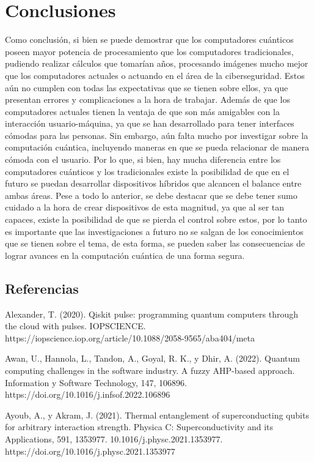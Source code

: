 \documentclass[twoside]{article}
\begin{document}
\section{Conclusiones}
Como conclusión, si bien se puede demostrar que los computadores cuánticos poseen mayor potencia de procesamiento que los computadores tradicionales, pudiendo realizar cálculos que tomarían años, procesando imágenes mucho mejor que los computadores actuales o actuando en el área de la ciberseguridad. Estos aún no cumplen con todas las expectativas que se tienen sobre ellos, ya que presentan errores y complicaciones a la hora de trabajar. Además de que los computadores actuales tienen la ventaja de que son más amigables con la interacción usuario-máquina, ya que se han desarrollado para tener interfaces cómodas para las personas. Sin embargo, aún falta mucho por investigar sobre la computación cuántica, incluyendo maneras en que se pueda relacionar de manera cómoda con el usuario. Por lo que, si bien, hay mucha diferencia entre los computadores cuánticos y los tradicionales existe la posibilidad de que en el futuro se puedan desarrollar dispositivos híbridos que alcancen el balance entre ambas áreas.
Pese a todo lo anterior, se debe destacar que se debe tener sumo cuidado a la hora de crear dispositivos de esta magnitud, ya que al ser tan capaces, existe la posibilidad de que se pierda el control sobre estos, por lo tanto es importante que las investigaciones a futuro no se salgan de los conocimientos que se tienen sobre el tema, de esta forma, se pueden saber las consecuencias de lograr avances en la computación cuántica de una forma segura.



\clearpage

\subsection{Referencias}
Alexander, T. (2020). Qiskit pulse: programming quantum computers through the cloud with pulses. IOPSCIENCE. https://iopscience.iop.org/article/10.1088/2058-9565/aba404/meta

Awan, U., Hannola, L., Tandon, A., Goyal, R. K., y Dhir, A. (2022). Quantum computing challenges in the software industry. A fuzzy AHP-based approach. Information y Software Technology, 147, 106896. https://doi.org/10.1016/j.infsof.2022.106896

Ayoub, A., y Akram, J. (2021). Thermal entanglement of superconducting qubits for arbitrary interaction strength. Physica C: Superconductivity and its Applications, 591, 1353977. 10.1016/j.physc.2021.1353977.
https://doi.org/10.1016/j.physc.2021.1353977
\end{document}
